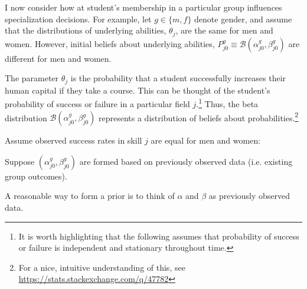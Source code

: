 \documentclass[10 pt]{article}
\newcommand{\pr}[1]{\left( #1 \right)}
\begin{document}

I now consider how at student's membership in a particular group influences specialization decisions. 
For example, let $g \in \{ m, f \}$ denote gender,  
and assume that the distributions of underlying abilities, $\theta_j$, are the same for men and women.
However, initial beliefs about underlying abilities, $P_{j0}^g \equiv \mathcal{B} \pr{\alpha_{j0}^g, \beta_{j0}^g}$ are different for men and women. 

\begin{blist}

\item The parameter $\theta_j$ is the probability that a student successfully increases their human capital if they take a course. 
This can be thought of the student's probability of success or failure in a particular field $j$.\footnote{
   It is worth highlighting that the following assumes that probability of success or failure is independent and stationary throughout time.}
Thus, the beta distribution $\mathcal{B} \pr{\alpha_{j0}^g, \beta_{j0}^g}$ represents a distribution of beliefs about probabilities.\footnote{For a nice, intuitive understanding of this, see \url{https://stats.stackexchange.com/q/47782}} 
\item 
Assume observed success rates in skill $j$ are equal for men and women:

Suppose $\pr{\alpha_{j0}^g, \beta_{j0}^g}$ are formed based on previously observed data (i.e. existing group outcomes). 


\item A reasonable way to form a prior is to think of $\alpha$ and $\beta$ as previously observed data.

\end{blist}




\printbibliography
\end{document}
